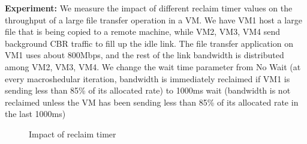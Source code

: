 {\bf Experiment:} We measure the impact of different reclaim timer values on the
throughput of a large file transfer operation in a VM.  We have VM1 host a large
file that is being copied to a remote machine, while VM2, VM3, VM4 send background CBR traffic
to fill up the idle link.  The file transfer application on
VM1 uses about 800Mbps, and the rest of the link bandwidth is distributed among
VM2, VM3, VM4.  We change the wait time parameter from No Wait (at every
macroshedular iteration, bandwidth is immediately reclaimed if VM1 is
sending less than 85\% of its allocated rate) to 1000ms wait (bandwidth is not
reclaimed unless the VM has been sending less than 85\% of its allocated rate in
the last 1000ms)

\begin{figure}[h]
\centering
{}
\vspace{-1em}
\caption{Impact of reclaim timer}
\vspace{-1em}
\label{fig:reclaim}
\end{figure}

